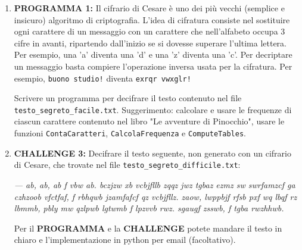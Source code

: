 \documentclass[11pt,a4]{article}
\begin{document}
\begin{enumerate}
\item {\bf PROGRAMMA 1:} Il cifrario di Cesare è uno dei più vecchi (semplice e insicuro) algoritmo di criptografia. 
L'idea di cifratura consiste nel sostituire ogni carattere di un messaggio con un carattere che nell'alfabeto
occupa 3 cifre in avanti, ripartendo dall'inizio se si dovesse superare l'ultima lettera. 
Per esempio, una 'a' diventa una 'd' e una 'z' diventa una 'c'. Per decriptare un messaggio basta compiere
l'operazione inversa usata per la cifratura. Per esempio, {\tt buono studio!} diventa {\tt exrqr vwxglr!}

Scrivere un programma per decifrare il testo contenuto nel file {\tt testo\_segreto\_facile.txt}.
Suggerimento: calcolare e usare le frequenze di ciascun carattere contenuto nel libro "Le avventure di Pinocchio",
usare le funzioni {\tt ContaCaratteri}, {\tt CalcolaFrequenza} e {\tt ComputeTables}.

\item {\bf CHALLENGE 3:} Decifrare il testo seguente, non generato con un cifrario di Cesare, che trovate 
nel file {\tt testo\_segreto\_difficile.txt}:

{\it — ab, ab, ab f vbw ab. bczjzw xb vcbjfllb zqqz jwz tgbaz ezmz sw swrfamzcf ga czhzoob vfctfaf, f rbhqwb jzamfafcf qz vcbjfllz. zaow, lwppbjf rfsb pxf wq lbqf rz lbmmb, pbly mw qzlpwb lgtwmb f lpzvvb rwz. sgaugf zsswb, f tgba rwzhhwb.}

Per il {\bf PROGRAMMA} e la {\bf CHALLENGE} potete mandare il testo in chiaro e l'implementazione in python per email (facoltativo).
\end{enumerate}
\end{document}
